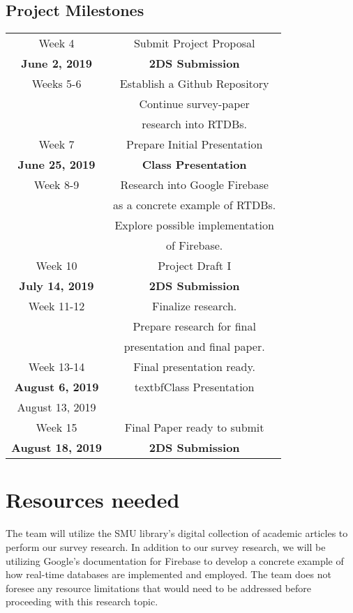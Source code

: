 \documentclass[conference]{IEEEtran}
\begin{document}
\subsection{Project Milestones}
\begin{tabular}{|c|c|}
\hline
Week 4 & Submit Project Proposal\\
\textbf{June 2, 2019} & \textbf{2DS Submission}\\
\hline
Weeks 5-6 & Establish a Github Repository\\
                   & Continue survey-paper \\
                   & research into RTDBs.\\
\hline
Week 7 & Prepare Initial Presentation\\
\textbf{June 25, 2019} &  \textbf{Class Presentation}\\
\hline
Week 8-9 & Research into Google Firebase \\
				& as a concrete example of RTDBs.\\
				&  Explore possible implementation\\ 
				& of Firebase.\\
\hline
Week 10  & Project Draft I\\
\textbf{July 14, 2019} & \textbf{2DS Submission}\\
\hline
Week 11-12 &  Finalize research.\\
				  & Prepare research for final \\
				  & presentation and final paper.\\
\hline
Week 13-14 & Final presentation ready.\\
\textbf{August 6, 2019} & textbf{Class Presentation}\\
August 13, 2019 & \\
\hline
Week 15 & Final Paper ready to submit \\
\textbf{August 18, 2019} & \textbf{2DS Submission}\\
\hline
\end{tabular}

\section{Resources needed}
The team will utilize the SMU library's digital collection of academic articles to perform our survey research. In addition to our survey research, we will be utilizing Google's documentation for Firebase to develop a concrete example of how real-time databases are implemented and employed. The team does not foresee any resource limitations that would need to be addressed before proceeding with this research topic.
\end{document}
